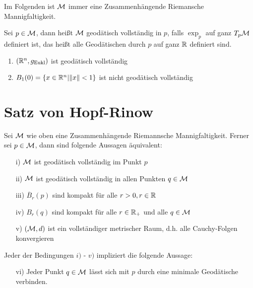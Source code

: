 
Im Folgenden ist $\mathcal{M}$ immer eine Zusammenhängende Riemansche Mannigfaltigkeit.

\begin{defs}
    Sei $p \in \mathcal{M}$, dann heißt $\mathcal{M}$ geodätisch vollständig in $p$, 
    falls $\exp_p$ auf ganz $T_p \mathcal{M}$ definiert ist,
    das heißt alle Geodätischen durch $p$ auf ganz $\mathbb{R}$ definiert sind.
\end{defs}

\begin{bsp}
    \label{bsp:geodvollstaendig}
    \begin{enumerate}
        \item $(\mathbb{R}^n, g_{\text{Eukl}})$ ist geodätisch vollständig
        \item $B_1 (0) = \{ x \in \mathbb{R}^n \vert \norm{x} < 1 \}$ ist nicht geodätisch vollständig
    \end{enumerate}
\end{bsp}



\section{Satz von Hopf-Rinow}

\begin{satz}
    \label{satz:hopfrinow}   
    Sei $\mathcal{M}$ wie oben eine Zusammenhängende Riemannsche Mannigfaltigkeit. 
    Ferner sei $p \in \mathcal{M}$, dann sind folgende Aussagen äquivalent:
    \begin{itemize}
    \item[i)] $\mathcal{M}$ ist geodätisch vollständig im Punkt $p$
    \item[ii)] $\mathcal{M}$ ist geodätisch vollständig in allen Punkten $q \in \mathcal{M}$
    \item[iii)] $\overline{B}_r (p)$ sind kompakt für alle $r > 0, r \in \mathbb{R}$
    \item[iv)] $B_r (q)$  sind kompakt für alle $r \in \mathbb{R}_+$ und alle $ q \in \mathcal{M}$
    \item[v)] $(\mathcal{M}, d)$ ist ein vollständiger metrischer Raum, 
    d.h. alle Cauchy-Folgen konvergieren
    \end{itemize}
    Jeder der Bedingungen $i)$ - $v)$ impliziert die folgende Aussage:
    \begin{itemize}
    \item[vi)] Jeder Punkt $q \in \mathcal{M}$ lässt sich mit $p$ durch eine 
    minimale Geodätische verbinden.
    \end{itemize}
\end{satz}

